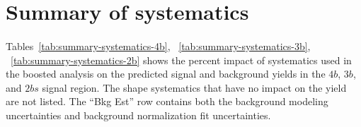 \section{Summary of systematics}
\label{sec:boosted-systematics-numbers}
\paragraph{}
Tables~\ref{tab:summary-systematics-4b}, ~\ref{tab:summary-systematics-3b}, ~\ref{tab:summary-systematics-2b} shows the percent impact of systematics used in the boosted analysis on the predicted signal and background yields in the $4b$, $3b$, and $2bs$ signal region.
The shape systematics that have no impact on the yield are not listed.
The ``Bkg Est'' row contains both the background modeling uncertainties and background normalization fit uncertainties.

